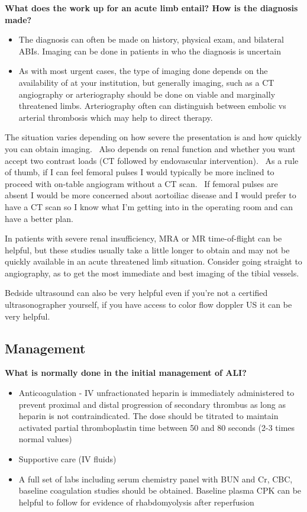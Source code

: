 \documentclass[
]{book}
\begin{document}
\textbf{What does the work up for an acute limb entail? How is the diagnosis
made?}

\begin{itemize}
\item
  The diagnosis can often be made on history, physical exam, and
  bilateral ABIs. Imaging can be done in patients in who the diagnosis
  is uncertain
\item
  As with most urgent cases, the type of imaging done depends on the
  availability of at your institution, but generally imaging, such as
  a CT angiography or arteriography should be done on viable and
  marginally threatened limbs. Arteriography often can distinguish
  between embolic vs arterial thrombosis which may help to direct
  therapy.
\end{itemize}

The situation varies depending on how severe the presentation is and how
quickly you can obtain imaging.~ Also depends on renal function and
whether you want accept two contrast loads (CT followed by endovascular
intervention).~ As a rule of thumb, if I can feel femoral pulses I would
typically be more inclined to proceed with on-table angiogram without a
CT scan.~ If femoral pulses are absent I would be more concerned about
aortoiliac disease and I would prefer to have a CT scan so I know what
I'm getting into in the operating room and can have a better plan.

In patients with severe renal insufficiency, MRA or MR time-of-flight
can be helpful, but these studies usually take a little longer to obtain
and may not be quickly available in an acute threatened limb situation.
Consider going straight to angiography, as to get the most immediate and
best imaging of the tibial vessels. \citep{creagerClinicalPracticeAcute2012, earnshaw100AcuteLimb2019}

Bedside ultrasound can also be very helpful even if you're not a
certified ultrasonographer yourself, if you have access to color flow
doppler US it can be very helpful.

\hypertarget{management-19}{%
\subsection{Management}\label{management-19}}

\textbf{What is normally done in the initial management of ALI?}

\begin{itemize}
\item
  Anticoagulation - IV unfractionated heparin is immediately
  administered to prevent proximal and distal progression of secondary
  thrombus as long as heparin is not contraindicated. The dose should
  be titrated to maintain activated partial thromboplastin time
  between 50 and 80 seconds (2-3 times normal values)
\item
  Supportive care (IV fluids)
\item
  A full set of labs including serum chemistry panel with BUN and Cr,
  CBC, baseline coagulation studies should be obtained. Baseline
  plasma CPK can be helpful to follow for evidence of rhabdomyolysis
  after reperfusion
\end{itemize}
\end{document}
